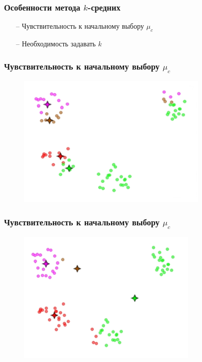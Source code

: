 \documentclass[12pt]{beamer}
\begin{document}
\begin{frame}\frametitle{Особенности метода $k$-средних}
\begin{itemize}
\item[--] Чувствительность к начальному выбору $\mu_c$
\item[--] Необходимость задавать $k$
\end{itemize}
\end{frame}

\begin{frame}\frametitle{Чувствительность к начальному выбору $\mu_c$}
\begin{figure}[htbp]
  \includegraphics[height=180pt, keepaspectratio = true]{images/local_min2}  
\end{figure}
\end{frame}

\begin{frame}\frametitle{Чувствительность к начальному выбору $\mu_c$}
\begin{figure}[htbp]
  \includegraphics[height=180pt, keepaspectratio = true]{images/local_min4}  
\end{figure}
\end{frame}
\end{document}
